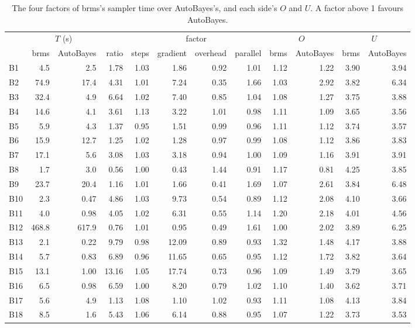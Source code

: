 \documentclass[11pt]{article}
\begin{document}
\begin{table}[H]
\footnotesize
\setlength{\tabcolsep}{4pt}
\begin{center}
\begin{tabular}{@{}lrrrrrrrrrrr@{}}
\toprule
& \multicolumn{2}{c}{$T$ (s)} & & \multicolumn{4}{c}{factor} & \multicolumn{2}{c}{$O$} & \multicolumn{2}{c}{$U$} \\
\cmidrule(lr){2-3}\cmidrule(lr){5-8}\cmidrule(lr){9-10}\cmidrule(lr){11-12}& brms & AutoBayes & ratio & steps & gradient & overhead & parallel & brms & AutoBayes & brms & AutoBayes \\
\midrule
B1 & 4.5 & 2.5 & 1.78 & 1.03 & 1.86 & 0.92 & 1.01 & 1.12 & 1.22 & 3.90 & 3.94 \\
B2 & 74.9 & 17.4 & 4.31 & 1.01 & 7.24 & 0.35 & 1.66 & 1.03 & 2.92 & 3.82 & 6.34 \\
B3 & 32.4 & 4.9 & 6.64 & 1.02 & 7.40 & 0.85 & 1.04 & 1.08 & 1.27 & 3.75 & 3.88 \\
B4 & 14.6 & 4.1 & 3.61 & 1.13 & 3.22 & 1.01 & 0.98 & 1.11 & 1.09 & 3.65 & 3.56 \\
B5 & 5.9 & 4.3 & 1.37 & 0.95 & 1.51 & 0.99 & 0.96 & 1.11 & 1.12 & 3.74 & 3.57 \\
B6 & 15.9 & 12.7 & 1.25 & 1.02 & 1.28 & 0.97 & 0.99 & 1.08 & 1.12 & 3.86 & 3.83 \\
B7 & 17.1 & 5.6 & 3.08 & 1.03 & 3.18 & 0.94 & 1.00 & 1.09 & 1.16 & 3.91 & 3.91 \\
B8 & 1.7 & 3.0 & 0.56 & 1.00 & 0.43 & 1.44 & 0.91 & 1.17 & 0.81 & 4.25 & 3.85 \\
B9 & 23.7 & 20.4 & 1.16 & 1.01 & 1.66 & 0.41 & 1.69 & 1.07 & 2.61 & 3.84 & 6.48 \\
B10 & 2.3 & 0.47 & 4.86 & 1.03 & 9.73 & 0.54 & 0.89 & 1.12 & 2.08 & 4.10 & 3.66 \\
B11 & 4.0 & 0.98 & 4.05 & 1.02 & 6.31 & 0.55 & 1.14 & 1.20 & 2.18 & 4.01 & 4.56 \\
B12 & 468.8 & 617.9 & 0.76 & 1.01 & 0.95 & 0.49 & 1.61 & 1.00 & 2.02 & 3.89 & 6.25 \\
B13 & 2.1 & 0.22 & 9.79 & 0.98 & 12.09 & 0.89 & 0.93 & 1.32 & 1.48 & 4.17 & 3.88 \\
B14 & 5.7 & 0.83 & 6.89 & 0.96 & 11.65 & 0.65 & 0.95 & 1.12 & 1.72 & 3.82 & 3.64 \\
B15 & 13.1 & 1.00 & 13.16 & 1.05 & 17.74 & 0.73 & 0.96 & 1.09 & 1.49 & 3.79 & 3.65 \\
B16 & 6.5 & 0.98 & 6.59 & 1.00 & 8.20 & 0.79 & 1.02 & 1.10 & 1.40 & 3.62 & 3.71 \\
B17 & 5.6 & 4.9 & 1.13 & 1.08 & 1.10 & 1.02 & 0.93 & 1.11 & 1.08 & 4.13 & 3.84 \\
B18 & 8.5 & 1.6 & 5.43 & 1.06 & 6.14 & 0.88 & 0.95 & 1.07 & 1.22 & 3.73 & 3.53 \\
\bottomrule
\end{tabular}\end{center}
\caption{\small The four factors of brms's sampler time over AutoBayes's, and each side's $O$ and $U$. A factor above 1 favours AutoBayes.}\label{tab:decomp}
\end{table}
\end{document}
